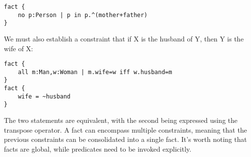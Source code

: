 \begin{lstlisting}[language=alloy]
fact {
    no p:Person | p in p.^(mother+father)
}
\end{lstlisting}
We must also establish a constraint that if X is the husband of Y, then Y is the wife of X:
\begin{lstlisting}[language=alloy]
fact {
    all m:Man,w:Woman | m.wife=w iff w.husband=m
}
fact {
    wife = ~husband
}
\end{lstlisting}
The two statements are equivalent, with the second being expressed using the transpose operator.
A fact can encompass multiple constraints, meaning that the previous constraints can be consolidated into a single fact.
It's worth noting that facts are global, while predicates need to be invoked explicitly.